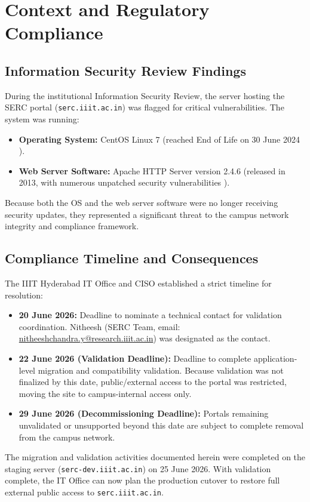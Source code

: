 \documentclass[11pt,a4paper,DIV=16,headings=normal,parskip=half]{scrartcl}
\begin{document}
\tableofcontents

\clearpage

\section{Context and Regulatory Compliance}

\subsection{Information Security Review Findings}
During the institutional Information Security Review, the server hosting the SERC portal (\texttt{serc.iiit.ac.in}) was flagged for critical vulnerabilities. The system was running:
\begin{itemize}
\item \textbf{Operating System:} CentOS Linux 7 (reached End of Life on 30 June 2024 \cite{centos7-eol}).
\item \textbf{Web Server Software:} Apache HTTP Server version 2.4.6 (released in 2013, with numerous unpatched security vulnerabilities \cite{apache-cves}).
\end{itemize}
Because both the OS and the web server software were no longer receiving security updates, they represented a significant threat to the campus network integrity and compliance framework.

\subsection{Compliance Timeline and Consequences}
The IIIT Hyderabad IT Office and CISO established a strict timeline for resolution:
\begin{itemize}
\item \textbf{20 June 2026:} Deadline to nominate a technical contact for validation coordination. Nitheesh (SERC Team, email: \href{mailto:nitheeshchandra.y@research.iiit.ac.in}{nitheeshchandra.y@research.iiit.ac.in}) was designated as the contact.
\item \textbf{22 June 2026 (Validation Deadline):} Deadline to complete application-level migration and compatibility validation. Because validation was not finalized by this date, public/external access to the portal was restricted, moving the site to campus-internal access only.
\item \textbf{29 June 2026 (Decommissioning Deadline):} Portals remaining unvalidated or unsupported beyond this date are subject to complete removal from the campus network.
\end{itemize}
The migration and validation activities documented herein were completed on the staging server (\texttt{serc-dev.iiit.ac.in}) on 25 June 2026. With validation complete, the IT Office can now plan the production cutover to restore full external public access to \texttt{serc.iiit.ac.in}.
\end{document}
